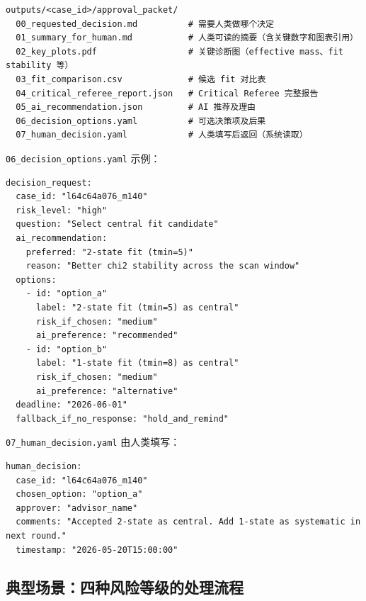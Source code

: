 \documentclass[11pt,a4paper,fontset=fandol]{ctexart}
\begin{document}
\begin{lstlisting}
outputs/<case_id>/approval_packet/
  00_requested_decision.md          # 需要人类做哪个决定
  01_summary_for_human.md           # 人类可读的摘要（含关键数字和图表引用）
  02_key_plots.pdf                  # 关键诊断图（effective mass、fit stability 等）
  03_fit_comparison.csv             # 候选 fit 对比表
  04_critical_referee_report.json   # Critical Referee 完整报告
  05_ai_recommendation.json         # AI 推荐及理由
  06_decision_options.yaml          # 可选决策项及后果
  07_human_decision.yaml            # 人类填写后返回（系统读取）
\end{lstlisting}

\texttt{06\_decision\_options.yaml} 示例：
\begin{lstlisting}
decision_request:
  case_id: "l64c64a076_m140"
  risk_level: "high"
  question: "Select central fit candidate"
  ai_recommendation:
    preferred: "2-state fit (tmin=5)"
    reason: "Better chi2 stability across the scan window"
  options:
    - id: "option_a"
      label: "2-state fit (tmin=5) as central"
      risk_if_chosen: "medium"
      ai_preference: "recommended"
    - id: "option_b"
      label: "1-state fit (tmin=8) as central"
      risk_if_chosen: "medium"
      ai_preference: "alternative"
  deadline: "2026-06-01"
  fallback_if_no_response: "hold_and_remind"
\end{lstlisting}

\texttt{07\_human\_decision.yaml} 由人类填写：
\begin{lstlisting}
human_decision:
  case_id: "l64c64a076_m140"
  chosen_option: "option_a"
  approver: "advisor_name"
  comments: "Accepted 2-state as central. Add 1-state as systematic in next round."
  timestamp: "2026-05-20T15:00:00"
\end{lstlisting}

\subsection{典型场景：四种风险等级的处理流程}
\end{document}
